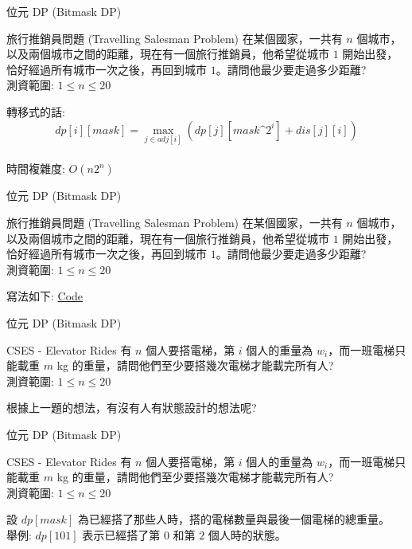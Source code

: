 \documentclass[aspectratio=169]{beamer}
\begin{document}
\begin{frame}[fragile]{位元 DP (Bitmask DP)}
    \begin{block}{旅行推銷員問題 (Travelling Salesman Problem)}
        在某個國家，一共有 $n$ 個城市，以及兩個城市之間的距離，現在有一個旅行推銷員，他希望從城市 $1$ 開始出發，恰好經過所有城市一次之後，再回到城市 $1$。請問他最少要走過多少距離?\\
        \vspace{5mm}
        測資範圍: $1 \le n \le 20$
    \end{block} 
    轉移式的話:
        $$dp[i][mask] = \max_{j \in adj[i]}(dp[j][mask\^2^i] + dis[j][i])$$ \pause \\
    時間複雜度: $O(n 2^n)$
\end{frame}

\begin{frame}[fragile]{位元 DP (Bitmask DP)}
    \begin{block}{旅行推銷員問題 (Travelling Salesman Problem)}
        在某個國家，一共有 $n$ 個城市，以及兩個城市之間的距離，現在有一個旅行推銷員，他希望從城市 $1$ 開始出發，恰好經過所有城市一次之後，再回到城市 $1$。請問他最少要走過多少距離?\\
        \vspace{5mm}
        測資範圍: $1 \le n \le 20$
    \end{block} 
    寫法如下:
        \href{https://github.com/HHSH-CYSH-WGSH-HSNU-Summer-Camp/DP-II/blob/main/Problem\%20Solution/abc180f.cpp}{Code}
\end{frame}

\begin{frame}[fragile]{位元 DP (Bitmask DP)}
    \begin{block}{CSES - Elevator Rides}
        有 $n$ 個人要搭電梯，第 $i$ 個人的重量為 $w_i$，而一班電梯只能載重 $m$ kg 的重量，請問他們至少要搭幾次電梯才能載完所有人? \\
        \vspace{5mm}
        測資範圍: $1 \le n \le 20$
    \end{block} 
    根據上一題的想法，有沒有人有狀態設計的想法呢?
\end{frame}

\begin{frame}[fragile]{位元 DP (Bitmask DP)}
    \begin{block}{CSES - Elevator Rides}
        有 $n$ 個人要搭電梯，第 $i$ 個人的重量為 $w_i$，而一班電梯只能載重 $m$ kg 的重量，請問他們至少要搭幾次電梯才能載完所有人? \\
        \vspace{5mm}
        測資範圍: $1 \le n \le 20$
    \end{block} 
    設 $dp[mask]$ 為已經搭了那些人時，搭的電梯數量與最後一個電梯的總重量。 \\
    舉例: $dp[101]$ 表示已經搭了第 $0$ 和第 $2$ 個人時的狀態。
\end{frame}
\end{document}
